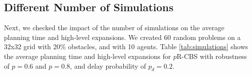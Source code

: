\documentclass{article}
\newcommand{\prcbs}{$p$R-CBS\xspace}
\begin{document}
\subsection{Different Number of Simulations}

\begin{table}[t]
\centering
{}
\caption{Average runtime, and HL expansions for \prcbs{} with different number of simulation, on a 32x32 grid with 20\% obstacles.}
\label{tab:simulations}
\end{table}


Next, we checked the impact of the number of simulations on the average planning time and high-level expansions. We created 60 random problems on a 32x32 grid with 20\% obstacles, and with 10 agents. Table \ref{tab:simulations} shows the average planning time and high-level expansions for \prcbs{} with robustness of $p=0.6$ and $p=0.8$, and delay probability of $p_d=0.2$. 
\end{document}

